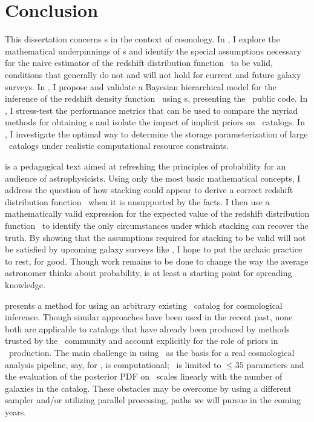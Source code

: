 \chapter*{Conclusion}

This dissertation concerns \pzpdf s in the context of cosmology.
In , I explore the mathematical underpinnings of \pzpdf s and identify the special assumptions necessary for the naive estimator of the redshift distribution function \Nz\ to be valid, conditions that generally do not and will not hold for current and future galaxy surveys.
In , I propose and validate a Bayesian hierarchical model for the inference of the redshift density function \nz\ using \pzpdf s, presenting the \chippr\ public code.
In , I stress-test the performance metrics that can be used to compare the myriad methods for obtaining \pzpdf s and isolate the impact of implicit priors on \pzpdf\ catalogs.
In , I investigate the optimal way to determine the storage parameterization of large \pzpdf\ catalogs under realistic computational resource constraints. 

 is a pedagogical text aimed at refreshing the principles of probability for an audience of astrophysicists.
Using only the most basic mathematical concepts, I address the question of how stacking could appear to derive a correct redshift distribution function \Nz\ when it is unsupported by the facts.
I then use a mathematically valid expression for the expected value of the redshift distribution function \Nz\ to identify the only circumstances under which stacking can recover the truth.
By showing that the assumptions required for stacking to be valid will not be satisfied by upcoming galaxy surveys like \lsst, I hope to put the archaic practice to rest, for good.
Though work remains to be done to change the way the average astronomer thinks about probability,  is at least a starting point for spreading knowledge.

 presents a method for using an arbitrary existing \pzpdf\ catalog for cosmological inference.
Though similar approaches have been used in the recent past, none both are applicable to catalogs that have already been produced by methods trusted by the \pz\ community and account explicitly for the role of priors in \pzpdf\ production.
The main challenge in using \chippr\ as the basis for a real cosmological analysis pipeline, say, for \lsst, is computational; \emcee\ is limited to $\leq 35$ parameters and the evaluation of the posterior PDF on \nz\ scales linearly with the number of galaxies in the catalog.
These obstacles may be overcome by using a different sampler and/or utilizing parallel processing, paths we will pursue in the coming years.

